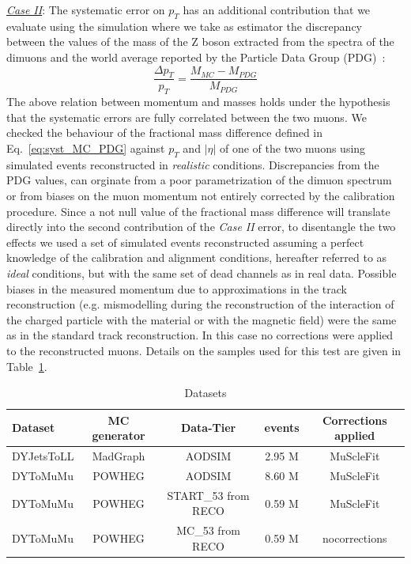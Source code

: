 \underline{\sl Case II}: The systematic error on $p_T$ has an additional
contribution that we evaluate using the simulation where we take as
estimator the
discrepancy between the values of the mass of the Z boson extracted
from the spectra of the dimuons 
and the world average reported by the Particle Data Group (PDG)~\cite{Beringer:1900zz}:
\begin{equation}
  \frac{\Delta p_T}{p_T}=\frac{M_{MC}-M_{PDG}}{M_{PDG}}
  \label{eq:syst_MC_PDG}
\end{equation}
The above relation between momentum
and masses holds under the hypothesis that the systematic errors are fully correlated between the two muons. 
We checked the  behaviour of the fractional mass difference defined
in Eq.~\ref{eq:syst_MC_PDG} against $p_T$ and $|\eta|$ of one of the two
muons using simulated events reconstructed in {\sl realistic} conditions.
Discrepancies from the PDG values, can orginate
from a poor parametrization of the dimuon spectrum
or from biases on the muon momentum not entirely corrected by the
calibration procedure.
Since a not null value of the fractional mass difference will translate directly into the second
contribution of the {\sl Case II} error,
to disentangle the two effects we used a set of
simulated events reconstructed assuming a perfect knowledge of the
calibration and alignment conditions, hereafter referred to as
{\sl ideal} conditions, but with the same set of
dead channels as in real data. Possible biases in the measured momentum due
to approximations in the track reconstruction (e.g. mismodelling
during the reconstruction of the interaction of the charged particle
with the material or with the magnetic field) were the same as
in the standard track reconstruction. In this case no corrections were
applied to the reconstructed muons. 
Details on the samples used for this test are given in Table~\ref{tab:datasets_for_systematics}.
\begin{table}[hbH]
\begin{center}
\caption{Datasets \label{tab:datasets_for_systematics}} 
\begin{tabular}{|l|c|c|c|c|}
\hline
Dataset & MC generator & Data-Tier & events & Corrections applied\\
\hline 
DYJetsToLL & MadGraph &  AODSIM              & 2.95 M & MuScleFit \\
DYToMuMu   & POWHEG   &  AODSIM              & 8.60 M & MuScleFit \\
DYToMuMu   & POWHEG   &  START\_53 from RECO & 0.59 M & MuScleFit \\
DYToMuMu   & POWHEG   &  MC\_53 from RECO    & 0.59 M & nocorrections \\
\hline
\hline
\end{tabular}
\end{center}
\end{table}

